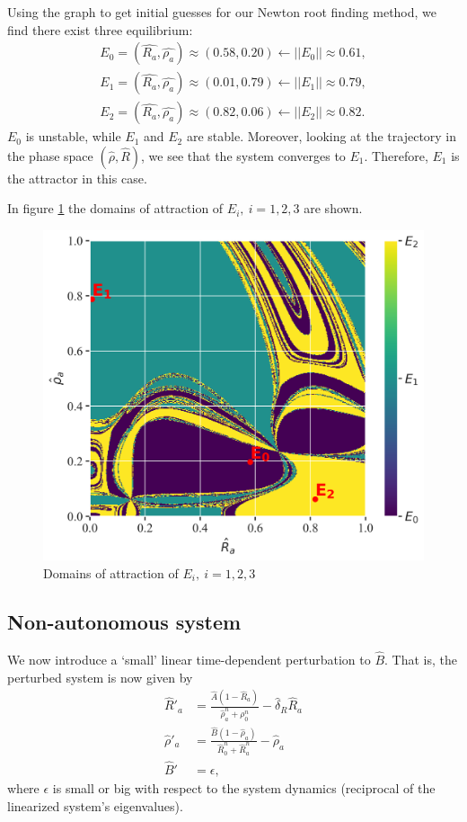 Using the graph to get initial guesses for our Newton root finding method, we find there exist three equilibrium:
\begin{align*}
    E_0=(\hat{R_a}, \hat{\rho_a}) \approx (0.58,0.20) \leftarrow ||E_0|| \approx 0.61, \\
    E_1=(\hat{R_a}, \hat{\rho_a}) \approx (0.01,0.79) \leftarrow ||E_1|| \approx 0.79, \\
    E_2=(\hat{R_a}, \hat{\rho_a}) \approx (0.82,0.06) \leftarrow ||E_2|| \approx 0.82.
\end{align*}
$E_0$ is unstable, while $E_1$ and $E_2$ are stable. Moreover, looking at the trajectory in the phase space $(\hat{\rho}, \hat{R})$, we see that the system converges to $E_1$. 
Therefore, $E_1$ is the attractor in this case.

In figure \ref{fig:cell_biology_domains_of_attraction} the domains of attraction of $E_i, \ i = 1,2,3$ are shown.
\begin{figure}[H]
    \centering
    \includegraphics[width= \textwidth]{figures/cb_domains_of_attraction.png}
    \caption{Domains of attraction of $E_i, \ i = 1,2,3$}
    \label{fig:cell_biology_domains_of_attraction}
\end{figure}

\subsection{Non-autonomous system}
We now introduce a `small' linear time-dependent perturbation to $\hat{B}$. That is, the perturbed system is now given by
\begin{align*}
    \hat{R}'_a &= \frac{\hat{A} \left(1 - \hat{R}_{a}\right)}{\hat{\rho}_a^{n} + \rho_{0}^{n}}  - \hat{\delta}_{R} \hat{R}_{a}\\
    \hat{\rho}'_a &= \frac{\hat{B} \left(1 - \hat{\rho}_a\right)}{\hat{R}_0^{n} + \hat{R}_{a}^{n}} - \hat{\rho}_a\\
    \hat{B}' &= \epsilon,
\end{align*}
where $\epsilon$ is small or big with respect to the system dynamics (reciprocal of the linearized system's eigenvalues). 

